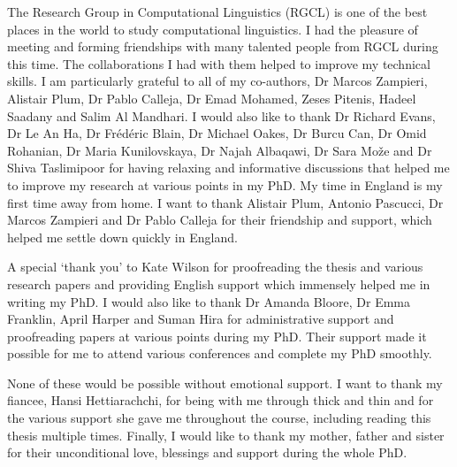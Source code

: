The Research Group in Computational Linguistics (RGCL) is one of the best places in the world to study computational linguistics. I had the pleasure of meeting and forming friendships with many talented people from RGCL during this time. The collaborations I had with them helped to improve my technical skills. I am particularly grateful to all of my co-authors, Dr Marcos Zampieri, Alistair Plum, Dr Pablo Calleja, Dr Emad Mohamed, Zeses Pitenis, Hadeel Saadany and Salim Al Mandhari. I would also like to thank Dr Richard Evans, Dr Le An Ha, Dr Frédéric Blain, Dr Michael Oakes, Dr Burcu Can, Dr Omid Rohanian, Dr Maria Kunilovskaya, Dr Najah Albaqawi, Dr Sara Može and Dr Shiva Taslimipoor for having relaxing and informative discussions that helped me to improve my research at various points in my PhD. My time in England is my first time away from home. I want to thank Alistair Plum, Antonio Pascucci, Dr Marcos Zampieri and Dr Pablo Calleja for their friendship and support, which helped me settle down quickly in England.  

A special ‘thank you’ to Kate Wilson for proofreading the thesis and various research papers and providing English support which immensely helped me in writing my PhD. I would also like to thank Dr Amanda Bloore, Dr Emma Franklin, April Harper and Suman Hira for administrative support and proofreading papers at various points during my PhD. Their support made it possible for me to attend various conferences and complete my PhD smoothly.

None of these would be possible without emotional support. I want to thank my fiancee, Hansi Hettiarachchi, for being with me through thick and thin and for the various support she gave me throughout the course, including reading this thesis multiple times. Finally, I would like to thank my mother, father and sister for their unconditional love, blessings and support during the whole PhD.



